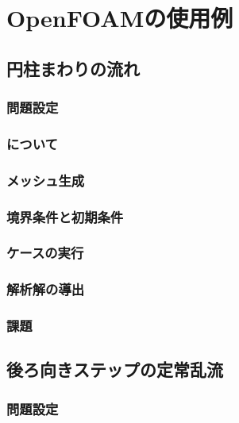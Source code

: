 \chapter{OpenFOAMの使用例}
\label{chap:3}


\section{円柱まわりの流れ}
\label{sec:3.1}

\subsection{問題設定}
\label{ssec:3.1.1}

\subsection{について}
\label{ssec:3.1.2}

\subsection{メッシュ生成}
\label{ssec:3.1.3}

\subsection{境界条件と初期条件}
\label{ssec:3.1.4}

\subsection{ケースの実行}
\label{ssec:3.1.5}

\subsection{解析解の導出}
\label{ssec:3.1.6}

\subsection{課題}
\label{ssec:3.1.7}


\section{後ろ向きステップの定常乱流}
\label{sec:3.2}

\subsection{問題設定}
\label{ssec:3.2.1}

